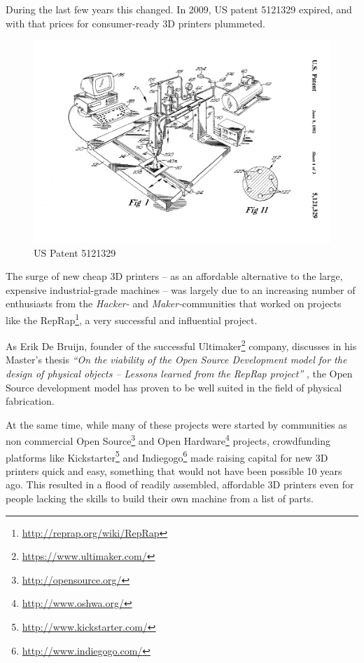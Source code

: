During the last few years this changed. In 2009, US patent 5121329
\cite{us5121329:1992} expired, and with that prices for consumer-ready 3D
printers plummeted.

\begin{figure}[h]
	\centering
	\includegraphics[width=\textwidth]{images/US5121329-1.png}
	\caption{US Patent 5121329}
	\label{img:us5121329a}
\end{figure}


\noindent The surge of new cheap 3D printers -- as an affordable alternative to
the large, expensive industrial-grade machines -- was largely due to an
increasing number of enthusiasts from the \emph{Hacker-} and
\emph{Maker-}communities that worked on projects like the
RepRap\footnote{\url{http://reprap.org/wiki/RepRap}}, a very successful and
influential project.

As Erik De Bruijn, founder of the successful
Ultimaker\footnote{\url{https://www.ultimaker.com/}} company, discusses in his
Master's thesis \textit{``On the viability of the Open Source Development model
for the design of physical objects -- Lessons learned from the RepRap project''}
\cite{bruijn:2010}, the Open Source development model has proven to be well
suited in the field of physical fabrication.

At the same time, while many of these projects were started by communities as
non commercial Open Source\footnote{\url{http://opensource.org/}} and Open
Hardware\footnote{\url{http://www.oshwa.org/}} projects, crowdfunding platforms
like Kickstarter\footnote{\url{http://www.kickstarter.com/}} and
Indiegogo\footnote{\url{http://www.indiegogo.com/}} made raising capital for new
3D printers quick and easy, something that would not have been possible 10 years
ago. This resulted in a flood of readily assembled, affordable 3D printers even
for people lacking the skills to build their own machine from a list of parts.

